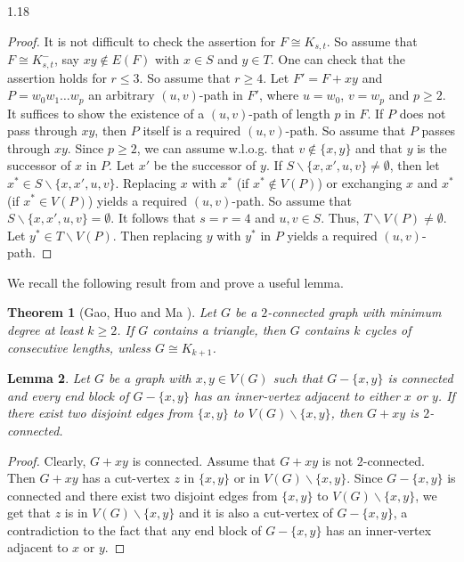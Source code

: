 \documentclass[10pt]{article}
\newtheorem{theorem}{Theorem}[section]
\newtheorem{lemma}[theorem]{Lemma}
\begin{document}
\begin{spacing}{1.18}
\begin{proof}
    It is not difficult to check the assertion for $F\cong K_{s,t}$. So assume that $F\cong K_{s,t}^-$, say $xy\notin E(F)$ with $x\in S$ and $y\in T$. One can check that the assertion holds for $r\leqslant 3$. So assume that $r\geqslant 4$. Let $F'=F+xy$ and $P=w_0w_1\ldots w_{p}$ an arbitrary $(u,v)$-path in $F'$, where $u=w_0$, $v=w_{p}$ and $p\geqslant 2$. It suffices to show the existence of a $(u,v)$-path of length $p$ in $F$. If $P$ does not pass through $xy$, then $P$ itself is a required $(u,v)$-path. So assume that $P$ passes through $xy$. Since $p\geqslant 2$, we can assume w.l.o.g. that $v\notin\{x,y\}$ and that $y$ is the successor of $x$ in $P$. Let $x'$ be the successor of $y$. If $S\backslash \{x,x',u,v\}\neq\emptyset$, then let $x^*\in S\backslash \{x,x',u,v\}$. Replacing $x$ with $x^*$ (if $x^*\notin V(P)$) or exchanging $x$ and $x^*$ (if $x^*\in V(P)$) yields a required $(u,v)$-path. So assume that $S\backslash \{x,x',u,v\}=\emptyset$. It follows that $s=r=4$ and $u,v\in S$. Thus, $T\backslash V(P)\neq \emptyset$. Let $y^*\in T\backslash V(P)$. Then replacing $y$ with $y^*$ in $P$ yields a required $(u,v)$-path.
\end{proof}

We recall the following result from \cite{GHM21} and prove a useful lemma.

\begin{theorem}[Gao, Huo and Ma \cite{GHM21}]\label{thm: 2-con-K3-k-cycles}
    Let $G$ be a $2$-connected graph with minimum degree at least $k\geqslant 2$. If $G$ contains a triangle, then $G$ contains $k$ cycles of consecutive lengths, unless $G\cong K_{k+1}$.
\end{theorem}


\begin{lemma}\label{LeGxy2-connected}
    Let $G$ be a graph with $x,y\in V(G)$ such that $G-\{x,y\}$ is connected and every end block of $G-\{x,y\}$ has an inner-vertex adjacent to either $x$ or $y$. If there exist two disjoint edges from $\{x,y\}$ to $V(G)\backslash\{x,y\}$, then $G+xy$ is $2$-connected.
\end{lemma}

\begin{proof}
    Clearly, $G+xy$ is connected. Assume that $G+xy$ is not $2$-connected. Then $G+xy$ has a cut-vertex $z$ in $\{x,y\}$ or in $V(G)\backslash \{x,y\}$. Since $G-\{x,y\}$ is connected and there exist two disjoint edges from $\{x,y\}$ to $V(G)\backslash\{x,y\}$, we get that $z$ is in $V(G)\backslash\{x,y\}$ and it is also a cut-vertex of $G-\{x,y\}$, a contradiction to the fact that any end block of $G-\{x,y\}$ has an inner-vertex adjacent to $x$ or $y$.
\end{proof}


\end{spacing}
\end{document}
